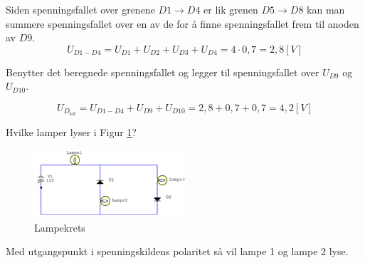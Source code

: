 \vspace{0.5cm} %

\begin{solution}[name=Løsningsforslag oppgave]
Siden spenningsfallet over grenene $D1 \rightarrow D4$ er lik grenen $D5 \rightarrow D8$ kan man summere spenningsfallet over en av de for å finne spenningsfallet frem til anoden av $D9$.
\[U_{D1-D4}=U_{D1}+U_{D2}+U_{D3}+U_{D4}= 4\cdot0,7=2,8[V]\]

Benytter det beregnede spenningsfallet og legger til spenningsfallet over $U_{D9}$ og $U_{D10}$.

\[U_{D_{tot}}=U_{D1-D4}+U_{D9}+U_{D10}=2,8+0,7+0,7=4,2 [V]\]

\end{solution}

\vspace{0.5cm} %



\begin{question}[name=Oppgave, topic=dioder]
	Hvilke lamper lyser i Figur \ref{fig:hvilkenLampe}?

	\begin{figure}[H]
		\centering
		\includegraphics[width=0.5\textwidth]{diode/figurer/hvalyser.png}
		\caption{Lampekrets}
		\label{fig:hvilkenLampe}
	\end{figure}


\end{question}

\vspace{0.5cm} %

\begin{solution}[name=Løsningsforslag oppgave]
Med utgangspunkt i spenningskildens polaritet så vil lampe 1 og lampe 2 lyse.

\end{solution}

\vspace{0.5cm} %


